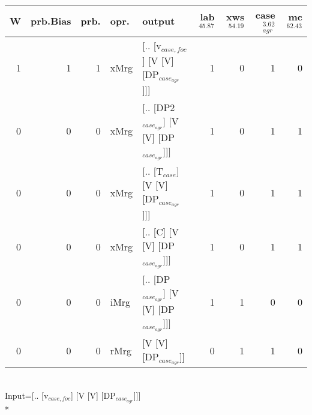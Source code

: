 \begin{tabularx}{\linewidth}{rrrlXrrrr}
\hline
   W &   prb.Bias &   prb. & opr.   & output                                    &   lab$^{45.87}$ &   xws$^{54.19}$ &   case$_{agr}^{3.62}$ &   mc$^{62.43}$ \\
\hline
   1 &       1 &   1 & xMrg & [.. [v$_{case,foc}$] [V [V] [DP$_{case_{agr}}$]]]   &             1 &             0 &                  1 &            0 \\
   0 &       0 &   0 & xMrg & [.. [DP2$_{case_{agr}}$] [V [V] [DP$_{case_{agr}}$]]] &             1 &             0 &                  1 &            1 \\
   0 &       0 &   0 & xMrg & [.. [T$_{case}$] [V [V] [DP$_{case_{agr}}$]]]       &             1 &             0 &                  1 &            1 \\
   0 &       0 &   0 & xMrg & [.. [C] [V [V] [DP$_{case_{agr}}$]]]            &             1 &             0 &                  1 &            1 \\
   0 &       0 &   0 & iMrg & [.. [DP$_{case_{agr}}$] [V [V] [DP$_{case_{agr}}$]]]  &             1 &             1 &                  0 &            0 \\
   0 &       0 &   0 & rMrg & [V [V] [DP$_{case_{agr}}$]]                     &             0 &             1 &                  1 &            0 \\
\hline
\end{tabularx}\endgroup\\
\begingroup\scriptsize Input=[.. [v$_{case,foc}$] [V [V] [DP$_{case_{agr}}$]]]\\*
